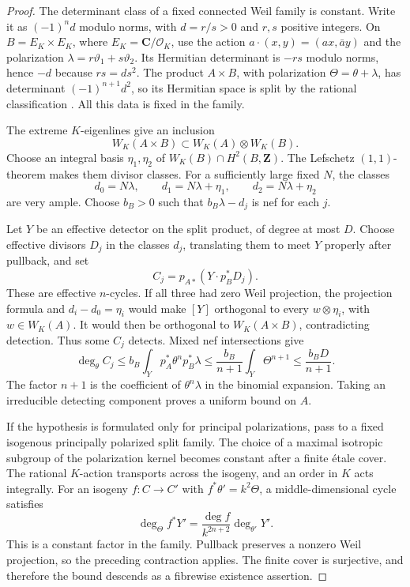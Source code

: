 \documentclass[11pt]{article}
\theoremstyle{definition}
\theoremstyle{remark}
\newcommand{\Z}{\mathbf Z}
\newcommand{\C}{\mathbf C}
\begin{document}
\begin{proof}
The determinant class of a fixed connected Weil family is constant. Write it as $(-1)^n d$ modulo norms, with $d=r/s>0$ and $r,s$ positive integers. On $B=E_K\times E_K$, where $E_K=\C/\mathcal O_K$, use the action $a\cdot(x,y)=(ax,\bar a y)$ and the polarization $\lambda=r\vartheta_1+s\vartheta_2$. Its Hermitian determinant is $-rs$ modulo norms, hence $-d$ because $rs=d s^2$. The product $A\times B$, with polarization $\Theta=\theta+\lambda$, has determinant $(-1)^{n+1}d^2$, so its Hermitian space is split by the rational classification \cite[Proposition~4.1 and Corollary~4.2]{Deligne82}. All this data is fixed in the family.

The extreme $K$-eigenlines give an inclusion
\[
 W_K(A\times B)\subset W_K(A)\otimes W_K(B).
\]
Choose an integral basis $\eta_1,\eta_2$ of $W_K(B)\cap H^2(B,\Z)$. The Lefschetz $(1,1)$-theorem makes them divisor classes. For a sufficiently large fixed $N$, the classes
\[
 d_0=N\lambda,\qquad d_1=N\lambda+\eta_1,
 \qquad d_2=N\lambda+\eta_2
\]
are very ample. Choose $b_B>0$ such that $b_B\lambda-d_j$ is nef for each $j$.

Let $Y$ be an effective detector on the split product, of degree at most $D$. Choose effective divisors $D_j$ in the classes $d_j$, translating them to meet $Y$ properly after pullback, and set
\[
 C_j=p_{A*}(Y\cdot p_B^*D_j).
\]
These are effective $n$-cycles. If all three had zero Weil projection, the projection formula and $d_i-d_0=\eta_i$ would make $[Y]$ orthogonal to every $w\otimes\eta_i$, with $w\in W_K(A)$. It would then be orthogonal to $W_K(A\times B)$, contradicting detection. Thus some $C_j$ detects. Mixed nef intersections give
\[
 \deg_\theta C_j
 \leq b_B\int_Yp_A^*\theta^n p_B^*\lambda
 \leq\frac{b_B}{n+1}\int_Y\Theta^{n+1}
 \leq\frac{b_BD}{n+1}.
\]
The factor $n+1$ is the coefficient of $\theta^n\lambda$ in the binomial expansion. Taking an irreducible detecting component proves a uniform bound on $A$.

If the hypothesis is formulated only for principal polarizations, pass to a fixed isogenous principally polarized split family. The choice of a maximal isotropic subgroup of the polarization kernel becomes constant after a finite \'etale cover. The rational $K$-action transports across the isogeny, and an order in $K$ acts integrally. For an isogeny $f:C\to C'$ with $f^*\theta'=k^2\Theta$, a middle-dimensional cycle satisfies
\[
 \deg_\Theta f^*Y'
 =\frac{\deg f}{k^{2n+2}}\deg_{\theta'}Y'.
\]
This is a constant factor in the family. Pullback preserves a nonzero Weil projection, so the preceding contraction applies. The finite cover is surjective, and therefore the bound descends as a fibrewise existence assertion.
\end{proof}
\end{document}
